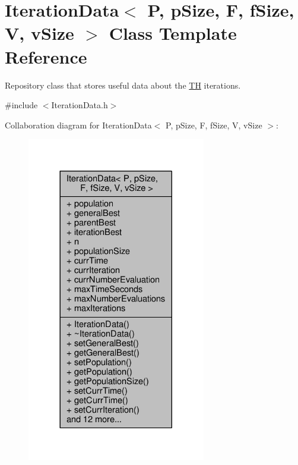 \hypertarget{structIterationData}{}\section{Iteration\+Data$<$ P, p\+Size, F, f\+Size, V, v\+Size $>$ Class Template Reference}
\label{structIterationData}


Repository class that stores useful data about the \hyperlink{classTH}{TH} iterations.  




{\ttfamily \#include $<$Iteration\+Data.\+h$>$}



Collaboration diagram for Iteration\+Data$<$ P, p\+Size, F, f\+Size, V, v\+Size $>$\+:\nopagebreak
\begin{figure}[H]
\begin{center}
\leavevmode
\includegraphics[width=221pt]{structIterationData__coll__graph}
\end{center}
\end{figure}
